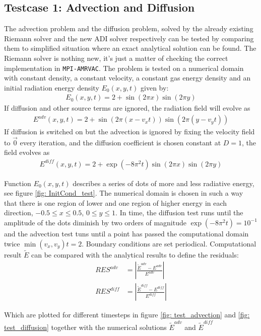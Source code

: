 \subsection{Testcase 1: Advection and Diffusion}
The advection problem and the diffusion problem, solved by the already existing Riemann solver and the new ADI solver respectively can be tested by comparing them to simplified situation where an exact analytical solution can be found. The Riemann solver is nothing new, it's just a matter of checking the correct implementation in \texttt{MPI-AMRVAC}. The problem is tested on a numerical domain with constant density, a constant velocity, a constant gas energy density and an initial radiation energy density $E_0(x,y,t)$ given by:
\begin{align}
E_0(x,y,t) = 2 + \sin(2 \pi x) \sin(2 \pi y)
\end{align}
If diffusion and other source terms are ignored, the radiation field will evolve as
\begin{align}
E^{adv}(x,y,t) = 2 + \sin(2 \pi (x-v_x t)) \sin(2 \pi (y-v_y t))
\end{align}
If diffusion is switched on but the advection is ignored by fixing the velocity field to $\vec{0}$ every iteration, and the diffusion coefficient is chosen constant at $D = 1$, the field evolves as
\begin{align}
E^{diff}(x,y,t) = 2 + \exp(-8 \pi^2 t) \sin(2 \pi x) \sin(2 \pi y)
\end{align}

Function $E_0(x,y,t)$ describes a series of dots of more and less radiative energy, see figure \ref{fig: InitCond_test}. The numerical domain is chosen in such a way that there is one region of lower and one region of higher energy in each direction, $-0.5 \leq x \leq 0.5$, $0 \leq y \leq 1$. In time, the diffusion test runs until the amplitude of the dots diminish by two orders of magnitude $\exp(-8 \pi^2 t)  = 10^{-1}$ and the advection test tuns until a point has passed the computational domain twice $ \min(v_x, v_y) t = 2 $. Boundary conditions are set periodical. Computational result $\tilde{E}$ can be compared with the analytical results to define the residuals:
\begin{align}
RES^{adv} &= \left|\frac{\tilde{E}^{adv} - E^{adv}}{E^{adv}}\right| \\
RES^{diff} &= \left|\frac{\tilde{E}^{diff} - E^{diff}}{E^{diff}}\right| 
\end{align}

Which are plotted for different timesteps in figure \ref{fig: test_advection} and \ref{fig: test_diffusion} together with the numerical solutions $\tilde{E}^{adv}$ and $\tilde{E}^{diff}$


